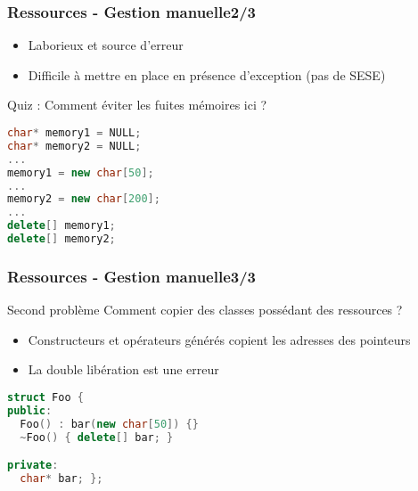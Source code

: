 \documentclass[C++.tex]{subfiles}
\begin{document}
\begin{frame}[fragile]
	\frametitle{Ressources - Gestion manuelle\titlehfill{}2/3}
	\begin{itemize}
		\item Laborieux et source d'erreur
		\item Difficile à mettre en place en présence d'exception (pas de SESE)
	\end{itemize}

	\begin{block}{Quiz : Comment éviter les fuites mémoires ici ?}
		\begin{lstlisting}[language=C++]
char* memory1 = NULL;
char* memory2 = NULL;
...
memory1 = new char[50];
...
memory2 = new char[200];
...
delete[] memory1;
delete[] memory2;\end{lstlisting}
	\end{block}
\end{frame}

\begin{frame}[fragile]
	\frametitle{Ressources - Gestion manuelle\titlehfill{}3/3}
	\begin{alertblock}{Second problème}
		Comment copier des classes possédant des ressources ?
	\end{alertblock}

	\begin{itemize}
		\item Constructeurs et opérateurs générés copient les adresses des pointeurs
		\item La double libération est une erreur
	\end{itemize}

	\begin{lstlisting}[language=C++]
struct Foo {
public:
  Foo() : bar(new char[50]) {}
  ~Foo() { delete[] bar; }

private:
  char* bar; };\end{lstlisting}
\end{frame}
\end{document}
